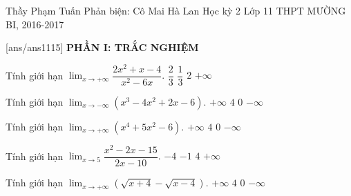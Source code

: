 \begin{name}
{Thầy Phạm Tuấn \newline  Phản biện: Cô Mai Hà Lan}
{Học kỳ 2 Lớp 11 THPT MƯỜNG BI, 2016-2017}
\end{name}

[ans/ans1115]
\setcounter{ex}{0} \setcounter{bt}{0}
\noindent
\textbf{PHẦN I: TRẮC NGHIỆM}
\begin{ex}%
	Tính giới hạn $\displaystyle \lim_{x \to +\infty} \dfrac{2x^2+x-4}{x^2-6x}.$
	\choice
	{$\dfrac{2}{3}$}
	{$\dfrac{1}{3}$}
	{\True $2$}
	{$+\infty$}
\end{ex}

\begin{ex}%
	Tính giới hạn $\displaystyle \lim_{x \to -\infty} \left (x^3-4x^2+2x-6\right ).$
	\choice
	{$+\infty$}
	{$4$}
	{$0$}
	{\True $-\infty$}
\end{ex}

\begin{ex}%
	Tính giới hạn $\displaystyle \lim_{x \to +\infty} \left (x^4+5x^2-6\right ).$
	\choice
	{\True $+\infty$}
	{$4$}
	{$0$}
	{$-\infty$}
\end{ex}

\begin{ex}%
	Tính giới hạn $\displaystyle \lim_{x \to 5} \dfrac{x^2-2x-15}{2x-10}.$
	\choice
	{$-4$}
	{$-1$}
	{\True $4$}
	{$+\infty$}
\end{ex}

\begin{ex}%
	Tính giới hạn $\displaystyle \lim_{x \to +\infty} \left (\sqrt{x+4}-\sqrt{x-4}\right ).$
	\choice
	{$+\infty$}
	{$4$}
	{\True  $0$}
	{$-\infty$}
\end{ex}

